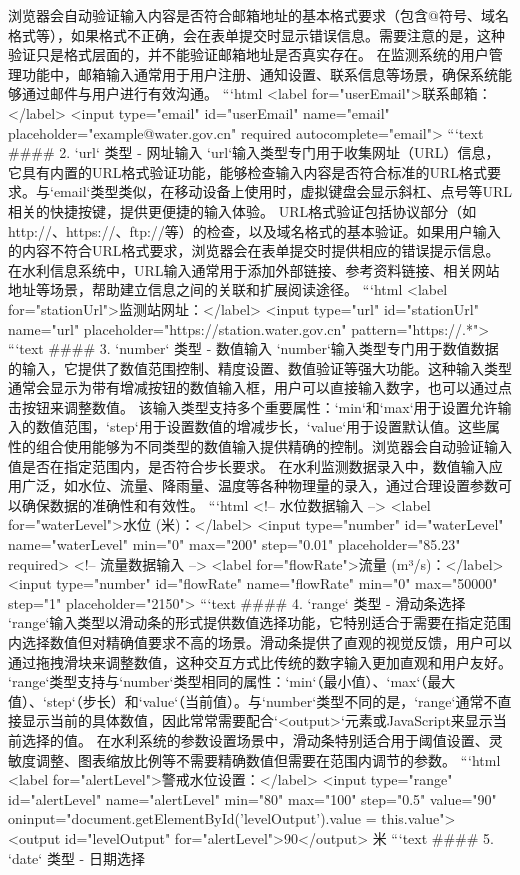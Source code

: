 {{浏览器会自动验证输入内容是否符合邮箱地址的基本格式要求（包含@符号、域名格式等），如果格式不正确，会在表单提交时显示错误信息。需要注意的是，这种验证只是格式层面的，并不能验证邮箱地址是否真实存在。 在监测系统的用户管理功能中，邮箱输入通常用于用户注册、通知设置、联系信息等场景，确保系统能够通过邮件与用户进行有效沟通。 ```html <label for="userEmail">联系邮箱：</label> <input type="email" id="userEmail" name="email" placeholder="example@water.gov.cn" required autocomplete="email"> ```text #### 2. `url` 类型 - 网址输入 `url`输入类型专门用于收集网址（URL）信息，它具有内置的URL格式验证功能，能够检查输入内容是否符合标准的URL格式要求。与`email`类型类似，在移动设备上使用时，虚拟键盘会显示斜杠、点号等URL相关的快捷按键，提供更便捷的输入体验。 URL格式验证包括协议部分（如http://、https://、ftp://等）的检查，以及域名格式的基本验证。如果用户输入的内容不符合URL格式要求，浏览器会在表单提交时提供相应的错误提示信息。 在水利信息系统中，URL输入通常用于添加外部链接、参考资料链接、相关网站地址等场景，帮助建立信息之间的关联和扩展阅读途径。 ```html <label for="stationUrl">监测站网址：</label> <input type="url" id="stationUrl" name="url" placeholder="https://station.water.gov.cn" pattern="https://.*"> ```text #### 3. `number` 类型 - 数值输入 `number`输入类型专门用于数值数据的输入，它提供了数值范围控制、精度设置、数值验证等强大功能。这种输入类型通常会显示为带有增减按钮的数值输入框，用户可以直接输入数字，也可以通过点击按钮来调整数值。 该输入类型支持多个重要属性：`min`和`max`用于设置允许输入的数值范围，`step`用于设置数值的增减步长，`value`用于设置默认值。这些属性的组合使用能够为不同类型的数值输入提供精确的控制。浏览器会自动验证输入值是否在指定范围内，是否符合步长要求。 在水利监测数据录入中，数值输入应用广泛，如水位、流量、降雨量、温度等各种物理量的录入，通过合理设置参数可以确保数据的准确性和有效性。 ```html <!-- 水位数据输入 --> <label for="waterLevel">水位 (米)：</label> <input type="number" id="waterLevel" name="waterLevel" min="0" max="200" step="0.01" placeholder="85.23" required> <!-- 流量数据输入 --> <label for="flowRate">流量 (m³/s)：</label> <input type="number" id="flowRate" name="flowRate" min="0" max="50000" step="1" placeholder="2150"> ```text #### 4. `range` 类型 - 滑动条选择 `range`输入类型以滑动条的形式提供数值选择功能，它特别适合于需要在指定范围内选择数值但对精确值要求不高的场景。滑动条提供了直观的视觉反馈，用户可以通过拖拽滑块来调整数值，这种交互方式比传统的数字输入更加直观和用户友好。 `range`类型支持与`number`类型相同的属性：`min`（最小值）、`max`（最大值）、`step`（步长）和`value`（当前值）。与`number`类型不同的是，`range`通常不直接显示当前的具体数值，因此常常需要配合`<output>`元素或JavaScript来显示当前选择的值。 在水利系统的参数设置场景中，滑动条特别适合用于阈值设置、灵敏度调整、图表缩放比例等不需要精确数值但需要在范围内调节的参数。 ```html <label for="alertLevel">警戒水位设置：</label> <input type="range" id="alertLevel" name="alertLevel" min="80" max="100" step="0.5" value="90" oninput="document.getElementById('levelOutput').value = this.value"> <output id="levelOutput" for="alertLevel">90</output> 米 ```text #### 5. `date` 类型 - 日期选择 }}
